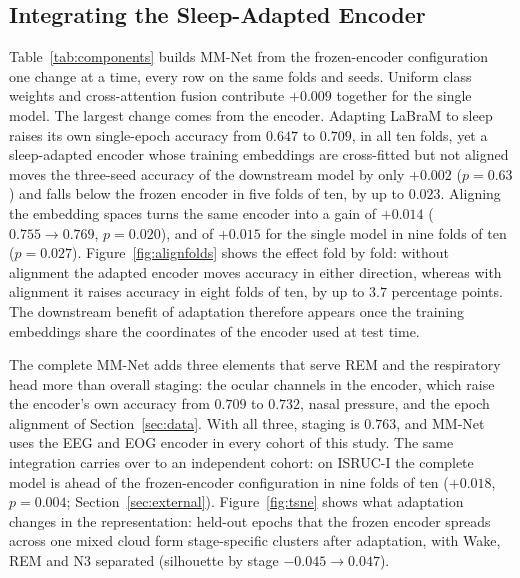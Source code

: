 \documentclass[a4paper,fleqn]{cas-sc}
\newcommand{\mmAcc}{0.763}
\begin{document}
\subsection{Integrating the Sleep-Adapted Encoder}
\label{sec:integration}
Table~\ref{tab:components} builds MM-Net from the frozen-encoder configuration one change at a
time, every row on the same folds and seeds. Uniform class weights and cross-attention fusion
contribute $+0.009$ together for the single model. The largest change comes from the encoder.
Adapting LaBraM to sleep raises its own single-epoch accuracy from $0.647$ to $0.709$, in all ten
folds, yet a sleep-adapted encoder whose training embeddings are cross-fitted but not aligned
moves the three-seed accuracy of the downstream model by only $+0.002$ ($p=0.63$) and falls below
the frozen encoder in five folds of ten, by up to $0.023$. Aligning the embedding spaces
turns the same encoder into a gain of $+0.014$ ($0.755\rightarrow0.769$, $p=0.020$), and of
$+0.015$ for the single model in nine folds of ten ($p=0.027$). Figure~\ref{fig:alignfolds} shows
the effect fold by fold: without alignment the adapted encoder moves accuracy in either direction,
whereas with alignment it raises accuracy in eight folds of ten, by up to $3.7$ percentage
points. The downstream benefit of adaptation therefore appears once the training embeddings share
the coordinates of the encoder used at test time.

The complete MM-Net adds three elements that serve REM and the respiratory head more than overall
staging: the ocular channels in the encoder, which raise the encoder's own accuracy from $0.709$
to $0.732$, nasal pressure, and the epoch alignment of Section~\ref{sec:data}. With all three,
staging is $\mmAcc$, and MM-Net uses the EEG and EOG encoder in every cohort of this study. The same integration carries over to an independent cohort: on ISRUC-I the complete model
is ahead of the frozen-encoder configuration in nine folds of ten ($+0.018$, $p=0.004$;
Section~\ref{sec:external}). Figure~\ref{fig:tsne} shows what adaptation changes in the
representation: held-out epochs that the frozen encoder spreads across one mixed cloud form
stage-specific clusters after adaptation, with Wake, REM and N3 separated (silhouette by stage
$-0.045\rightarrow0.047$).
\end{document}
